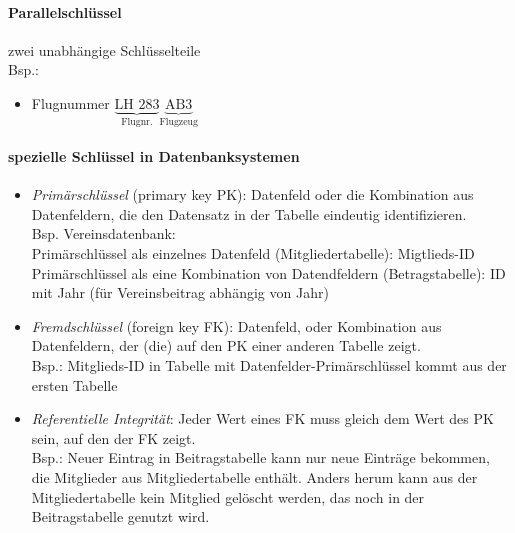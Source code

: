 \paragraph{Parallelschlüssel} \parskp
zwei unabhängige Schlüsselteile\\
Bsp.:
\begin{itemize}
\item Flugnummer $\underbrace{\text{LH 283}}_{\text{Flugnr.}} \underbrace{\text{AB3}}_{\text{Flugzeug}}$
\end{itemize}
\paragraph{spezielle Schlüssel in Datenbanksystemen}
\begin{itemize}
\item \emph{Primärschlüssel} (primary key PK): Datenfeld oder die Kombination aus Datenfeldern, die den Datensatz in der Tabelle eindeutig identifizieren.\\
Bsp. Vereinsdatenbank: \\
Primärschlüssel als einzelnes Datenfeld (Mitgliedertabelle): Migtlieds-ID\\ 
Primärschlüssel als eine Kombination von Datendfeldern (Betragstabelle): ID mit Jahr (für Vereinsbeitrag abhängig von Jahr)
\item \emph{Fremdschlüssel} (foreign key FK): Datenfeld, oder Kombination aus Datenfeldern, der (die) auf den PK einer anderen Tabelle zeigt.\\
Bsp.: Mitglieds-ID in Tabelle mit Datenfelder-Primärschlüssel kommt aus der ersten Tabelle
\item \emph{Referentielle Integrität}: Jeder Wert eines FK muss gleich dem Wert des PK sein, auf den der FK zeigt.\\
Bsp.: Neuer Eintrag in Beitragstabelle kann nur neue Einträge bekommen, die Mitglieder aus Mitgliedertabelle enthält. Anders herum kann aus der Mitgliedertabelle kein Mitglied gelöscht werden, das noch in der Beitragstabelle genutzt wird.
\end{itemize}

